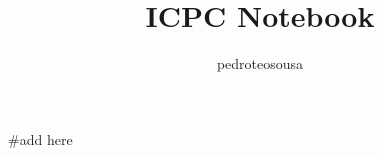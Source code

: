 \documentclass{article}
\title{ICPC Notebook}
\author{pedroteosousa }
\date{}
\begin{document}
\maketitle
\tableofcontents

#add here
\end{document}

